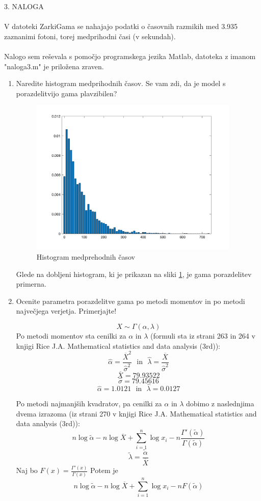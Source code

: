 \documentclass[a4paper]{article}
\begin{document}
\large{3. NALOGA} \\ \\
V datoteki ZarkiGama se nahajajo podatki o časovnih razmikih med 3.935 zaznanimi fotoni, torej medprihodni časi (v sekundah). \\ \\
Nalogo sem reševala s pomočjo programskega jezika Matlab, datoteka z imanom "naloga3.m" je priložena zraven. 
\begin{enumerate}[label=(\alph*)]
\item Naredite histogram medprihodnih časov. Se vam zdi, da je model s porazdelitvijo gama plavzibilen?
\begin{figure}[h!]
\centering
\includegraphics[width=10cm]{histogram3.png}
\caption{Histogram medprehodnih časov}
\label{fig:hist}
\end{figure}

Glede na dobljeni histogram, ki je prikazan na sliki \ref{fig:hist}, je gama porazdelitev primerna.

\item Ocenite parametra porazdelitve gama po metodi momentov in po metodi največjega verjetja. Primerjajte!

$$X  \sim \Gamma(\alpha, \lambda)$$
Po metodi momentov sta cenilki za $\alpha$ in $\lambda$ (formuli sta iz strani 263 in 264 v knjigi Rice J.A. Mathematical statistics and data analysis (3rd)):
$$\hat{\alpha} = \frac{\overline{X}^2}{\hat{\sigma}^2} \ \ \ \text{in} \ \ \ \hat{\lambda} = \frac{\overline{X}}{\hat{\sigma}^2} $$
$$\overline{X} = 79.93522$$
$$\hat{\sigma} = 79.45616$$
$$\hat{\alpha} = 1.0121 \ \ \  \text{in} \ \ \ \hat{\lambda} =  0.0127 $$

Po metodi najmanjših kvadratov, pa cenilki za $\alpha$ in $\lambda$ dobimo z naslednjima dvema izrazoma (iz strani 270 v knjigi Rice J.A. Mathematical statistics and data analysis (3rd)):
$$n\log{\tilde{\alpha}} - n\log{\overline{X}} + \sum_{i=1}^{n} \log{x_i} - n\frac{\Gamma'(\tilde{\alpha})}{\Gamma(\tilde{\alpha})}$$
$$\tilde{\lambda} = \frac{\tilde{\alpha}}{\overline{X}}$$
Naj bo $F(x) = \frac{\Gamma'(x)}{\Gamma(x)}$
Potem je 
$$n\log{\tilde{\alpha}} - n\log{\overline{X}} + \sum_{i=1}^{n} \log{x_i} - nF(\tilde{\alpha})$$


\end{enumerate}
\end{document}
